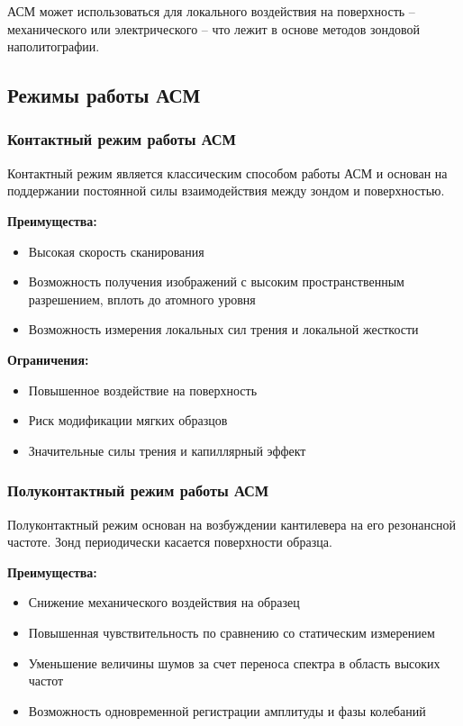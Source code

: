 \documentclass[a4paper,12pt]{article}
\begin{document}
АСМ может использоваться для локального воздействия на поверхность -- механического или электрического -- что лежит в основе методов зондовой наполитографии.

\subsection{Режимы работы АСМ}

\subsubsection{Контактный режим работы АСМ}

Контактный режим является классическим способом работы АСМ и основан на поддержании постоянной силы взаимодействия между зондом и поверхностью. 

\textbf{Преимущества:}
\begin{itemize}
    \item Высокая скорость сканирования
    \item Возможность получения изображений с высоким пространственным разрешением, вплоть до атомного уровня
    \item Возможность измерения локальных сил трения и локальной жесткости
\end{itemize}

\textbf{Ограничения:}
\begin{itemize}
    \item Повышенное воздействие на поверхность
    \item Риск модификации мягких образцов
    \item Значительные силы трения и капиллярный эффект
\end{itemize}

\subsubsection{Полуконтактный режим работы АСМ}

Полуконтактный режим основан на возбуждении кантилевера на его резонансной частоте. Зонд периодически касается поверхности образца.

\textbf{Преимущества:}
\begin{itemize}
    \item Снижение механического воздействия на образец
    \item Повышенная чувствительность по сравнению со статическим измерением
    \item Уменьшение величины шумов за счет переноса спектра в область высоких частот
    \item Возможность одновременной регистрации амплитуды и фазы колебаний
\end{itemize}
\end{document}

